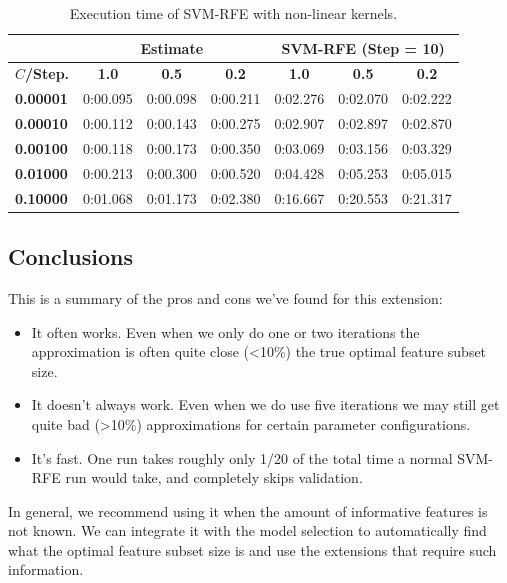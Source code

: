 \begin{table}[H]
    \centering
    \begin{tabular}{l | c c c | c c c}
        \toprule
         & \multicolumn{3}{c}{\textbf{Estimate}} & \multicolumn{3}{c}{\textbf{SVM-RFE (Step = 10)}} \\
        \midrule
        \textbf{$C$/Step.}&\textbf{1.0}&\textbf{0.5}&\textbf{0.2}&\textbf{1.0}&\textbf{0.5}&\textbf{0.2} \\
        \midrule
        \textbf{0.00001} & 0:00.095 & 0:00.098 & 0:00.211 &     0:02.276 & 0:02.070 & 0:02.222\\
        \textbf{0.00010} & 0:00.112 & 0:00.143 & 0:00.275 &     0:02.907 & 0:02.897 & 0:02.870\\
        \textbf{0.00100} & 0:00.118 & 0:00.173 & 0:00.350 &     0:03.069 & 0:03.156 & 0:03.329\\
        \textbf{0.01000} & 0:00.213 & 0:00.300 & 0:00.520 &     0:04.428 & 0:05.253 & 0:05.015\\
        \textbf{0.10000} & 0:01.068 & 0:01.173 & 0:02.380 &     0:16.667 & 0:20.553 & 0:21.317\\
        \bottomrule
        \end{tabular}
    \caption{Execution time of SVM-RFE with non-linear kernels.}
    \label{fig:ch5.stopcond.art.tabletime}
\end{table}

\subsection{Conclusions}

This is a summary of the pros and cons we've found for this extension:

\begin{itemize}
    \item It often works. Even when we only do one or two iterations the approximation is often quite close (<10\%) the true optimal feature subset size.
    \item It doesn't always work. Even when we do use five iterations we may still get quite bad (>10\%) approximations for certain parameter configurations.
    \item It's fast. One run takes roughly only 1/20 of the total time a normal SVM-RFE run would take, and completely skips validation.
\end{itemize}

In general, we recommend using it when the amount of informative features is not known. We can integrate it with the model selection to automatically find what the optimal feature subset size is and use the extensions that require such information.

